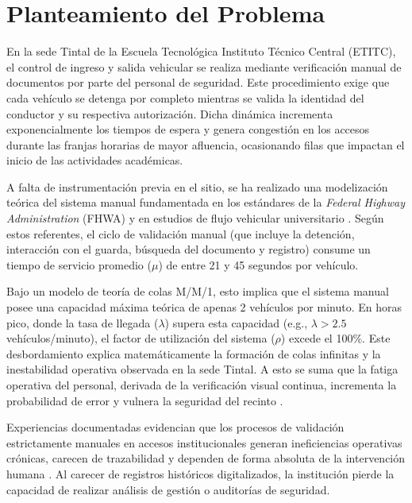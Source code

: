 \documentclass[12pt, letterpaper]{article}
\begin{document}
\section{Planteamiento del Problema}

En la sede Tintal de la Escuela Tecnológica Instituto Técnico Central (ETITC), el control de ingreso y salida vehicular se realiza mediante verificación manual de documentos por parte del personal de seguridad. Este procedimiento exige que cada vehículo se detenga por completo mientras se valida la identidad del conductor y su respectiva autorización. Dicha dinámica incrementa exponencialmente los tiempos de espera y genera congestión en los accesos durante las franjas horarias de mayor afluencia, ocasionando filas que impactan el inicio de las actividades académicas.

A falta de instrumentación previa en el sitio, se ha realizado una modelización teórica del sistema manual fundamentada en los estándares de la \textit{Federal Highway Administration} (FHWA) y en estudios de flujo vehicular universitario \parencite{fhwa_traffic_2017, aljaleel2022traffic}. Según estos referentes, el ciclo de validación manual (que incluye la detención, interacción con el guarda, búsqueda del documento y registro) consume un tiempo de servicio promedio ($\mu$) de entre 21 y 45 segundos por vehículo.

Bajo un modelo de teoría de colas M/M/1, esto implica que el sistema manual posee una capacidad máxima teórica de apenas 2 vehículos por minuto. En horas pico, donde la tasa de llegada ($\lambda$) supera esta capacidad (e.g., $\lambda > 2.5$ vehículos/minuto), el factor de utilización del sistema ($\rho$) excede el 100\%. Este desbordamiento explica matemáticamente la formación de colas infinitas y la inestabilidad operativa observada en la sede Tintal. A esto se suma que la fatiga operativa del personal, derivada de la verificación visual continua, incrementa la probabilidad de error y vulnera la seguridad del recinto \parencite{aamva_alpr_2021}.

Experiencias documentadas evidencian que los procesos de validación estrictamente manuales en accesos institucionales generan ineficiencias operativas crónicas, carecen de trazabilidad y dependen de forma absoluta de la intervención humana \parencite{macias1996acceso, oloriz2022certificacion}. Al carecer de registros históricos digitalizados, la institución pierde la capacidad de realizar análisis de gestión o auditorías de seguridad.
\end{document}
